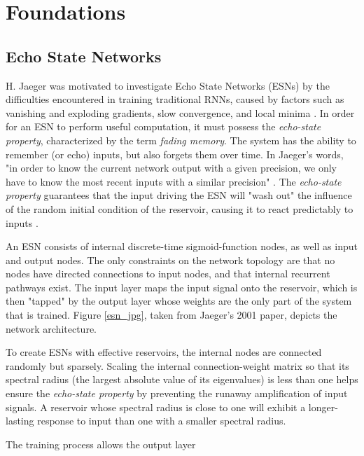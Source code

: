 \documentclass{article}
\begin{document}
            \section{Foundations}\label{foundations}
            \subsection{Echo State Networks}\label{esn}
    H.  Jaeger was motivated to investigate Echo State Networks (ESNs) by the 
    difficulties encountered in training traditional RNNs, caused by factors 
    such as vanishing and exploding gradients, slow convergence, and local 
    minima  \cite{jaeger2001echo}. In order for an ESN to perform useful 
    computation, it must possess the \textit{echo-state property}, 
    characterized by the term \textit{fading memory}. The system has the 
    ability to remember (or echo) inputs, but also forgets them over time. In 
    Jaeger's words, "in order to know the current network output with a given 
    precision, we only have to know the most recent inputs with a similar 
    precision" \cite{jaeger2001echo}. The \textit{echo-state property} 
    guarantees that the input driving the ESN will "wash out" the influence of 
    the random initial condition of the reservoir, causing it to react 
    predictably to inputs \cite{jaeger2001echo}.\par An ESN consists of 
    internal discrete-time sigmoid-function nodes, as well as input and output 
    nodes. The only constraints on the network topology are that no nodes have 
    directed connections to input nodes, and that internal recurrent pathways 
    exist. The input layer maps the input signal onto the reservoir, which is 
    then "tapped" by the output layer whose weights are the only part of the 
    system that is trained. Figure \ref{esn_jpg}, taken from Jaeger's 2001 
    paper,  depicts the network architecture.\par To create ESNs with effective 
    reservoirs, the internal nodes are connected randomly but sparsely.  
    Scaling the internal connection-weight matrix so that its spectral radius 
    (the largest absolute value of its eigenvalues) is less than one helps 
    ensure the \textit{echo-state property} by preventing the runaway 
    amplification of input signals. A reservoir whose spectral radius is close 
    to one will exhibit a longer-lasting response to input than one with a 
    smaller spectral radius.  \par The training process allows the output layer 
\end{document}
